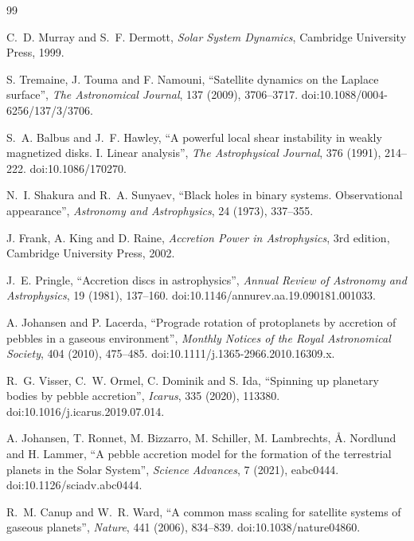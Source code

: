 \documentclass[11pt,a4paper,openany]{report}
\begin{document}
\clearpage
{}
{}
\begin{thebibliography}{99}
\small

 C.~D. Murray and S.~F. Dermott, \emph{Solar System Dynamics},
Cambridge University Press, 1999.

 S. Tremaine, J. Touma and F. Namouni, ``Satellite dynamics on the
Laplace surface'', \emph{The Astronomical Journal}, 137 (2009), 3706--3717.
doi:10.1088/0004-6256/137/3/3706.

 S.~A. Balbus and J.~F. Hawley, ``A powerful local shear instability in
weakly magnetized disks. I. Linear analysis'', \emph{The Astrophysical Journal}, 376 (1991),
214--222. doi:10.1086/170270.

 N.~I. Shakura and R.~A. Sunyaev, ``Black holes in binary systems.
Observational appearance'', \emph{Astronomy and Astrophysics}, 24 (1973), 337--355.

 J. Frank, A. King and D. Raine, \emph{Accretion Power in Astrophysics},
3rd edition, Cambridge University Press, 2002.

 J.~E. Pringle, ``Accretion discs in astrophysics'', \emph{Annual Review of
Astronomy and Astrophysics}, 19 (1981), 137--160. doi:10.1146/annurev.aa.19.090181.001033.

 A. Johansen and P. Lacerda, ``Prograde rotation of protoplanets by
accretion of pebbles in a gaseous environment'', \emph{Monthly Notices of the Royal Astronomical
Society}, 404 (2010), 475--485. doi:10.1111/j.1365-2966.2010.16309.x.

 R.~G. Visser, C.~W. Ormel, C. Dominik and S. Ida, ``Spinning up planetary
bodies by pebble accretion'', \emph{Icarus}, 335 (2020), 113380. doi:10.1016/j.icarus.2019.07.014.

 A. Johansen, T. Ronnet, M. Bizzarro, M. Schiller, M. Lambrechts,
Å. Nordlund and H. Lammer, ``A pebble accretion model for the formation of the terrestrial planets
in the Solar System'', \emph{Science Advances}, 7 (2021), eabc0444. doi:10.1126/sciadv.abc0444.

 R.~M. Canup and W.~R. Ward, ``A common mass scaling for satellite systems
of gaseous planets'', \emph{Nature}, 441 (2006), 834--839. doi:10.1038/nature04860.


\end{thebibliography}
\end{document}
